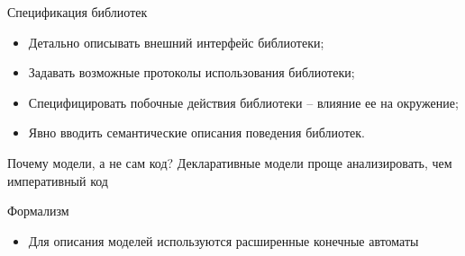 \documentclass[12pt]{beamer}
\begin{document}
{
\begin{frame}{Спецификация библиотек}
\begin{mybox}[]
\begin{itemize}
	\item Детально описывать внешний интерфейс библиотеки;
	\item Задавать возможные протоколы использования библиотеки;
	\item Специфицировать побочные действия библиотеки – влияние ее на окружение;
	\item Явно вводить семантические описания поведения библиотек.
\end{itemize}
\end{mybox}

\begin{alertblock}{Почему модели, а не сам код?}
Декларативные модели проще анализировать, чем императивный код
\end{alertblock}
\end{frame}
}

\begin{frame}[fragile]{Формализм}
  \begin{mybox}[]
  \begin{itemize}
  	\item Для описания моделей используются расширенные конечные автоматы
  \end{itemize}
  \end{mybox}
\end{frame}

\end{document}
